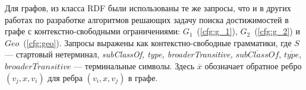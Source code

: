 

Для графов, из класса RDF были использованы те же запросы, что и в других работах по разработке алгоритмов решающих задачу поиска достижимостей в графе с контекстно-свободными ограничениями: $G_1$~(\ref{cfg:g_1}), $G_2$~(\ref{cfg:g_2}) и $Geo$~(\ref{cfg:geo}).
Запросы выражены как контекстно-свободные грамматики, где $S$ --- стартовый нетерминал, \textit{subClassOf, type, broaderTransitive, }$ \overline{\textit{subClassOf}}$, $\overline{\textit{type}}$, $\overline{\textit{broaderTransitive}}$ --- терминальные символы.
Здесь $\overline{x}$ обозначает обратное ребро $(v_j, x, v_i)$ для ребра $(v_i, x, v_j)$ в графе.
    
